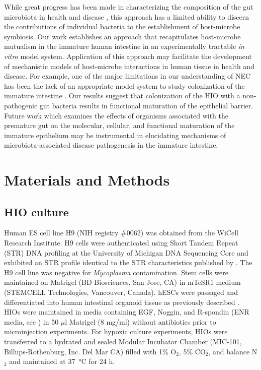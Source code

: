 \documentclass[9pt,lineo]{elife}
\begin{document}
While great progress has been made in characterizing the composition of the gut microbiota in health and disease \citep{Shreiner:2015,Costello:2012}, this approach has a limited ability to discern the contributions of individual bacteria to the establishment of host-microbe symbiosis. Our work establishes an approach that recapitulates host-microbe mutualism in the immature human intestine in an experimentally tractable \emph{in vitro} model system. Application of this approach may facilitate the development of mechanistic models of host-microbe interactions in human tissue in health and disease. For example, one of the major limitations in our understanding of NEC has been the lack of an appropriate model system to study colonization of the immature intestine \citep{Neu:2011,Balimane:2005,Tanner:2015,Nguyen:2015}. Our results suggest that colonization of the HIO with a non-pathogenic gut bacteria results in functional maturation of the epithelial barrier. Future work which examines the effects of organisms associated with the premature gut \citep{Morrow:2013,Greenwood:2014,Ward:2016} on the molecular, cellular, and functional maturation of the immature epithelium may be instrumental in elucidating mechanisms of microbiota-associated disease pathogenesis in the immature intestine.

\section*{{\bfseries\sffamily } Materials and Methods}
\label{sec:orgheadline27}

\subsection*{{\bfseries\sffamily } HIO culture}
\label{sec:orgheadline14}
Human ES cell line H9 (NIH registry \#0062) was obtained from the WiCell Research Institute. H9 cells were authenticated using Short Tandem Repeat (STR) DNA profiling \citep{Matsuo:1999} at the University of Michigan DNA Sequencing Core and exhibited an STR profile identical to the STR characteristics published by \cite{Josephson:2006}. The H9 cell line was negative for \emph{Mycoplasma} contamination. Stem cells were maintained on Matrigel (BD Biosciences, San Jose, CA) in mTeSR1 medium (STEMCELL Technologies, Vancouver, Canada). hESCs were passaged and differentiated into human intestinal organoid tissue as previously described \citep{Spence:2011,McCracken:2011}. HIOs were maintained in media containing EGF, Noggin, and R-spondin (ENR media, see \cite{McCracken:2011}) in 50 \(\mu\)l Matrigel (8 mg/ml) without antibiotics prior to microinjection experiments.
For hypoxic culture experiments, HIOs were transferred to a hydrated and sealed Modular Incubator Chamber (MIC-101, Billups-Rothenburg, Inc. Del Mar CA) filled with 1\% O\(_{\text{2}}\), 5\% CO\(_{\text{2}}\), and balance N\(_{\text{2}}\) and maintained at \SI{37}{\celsius} for 24 h.
\end{document}
